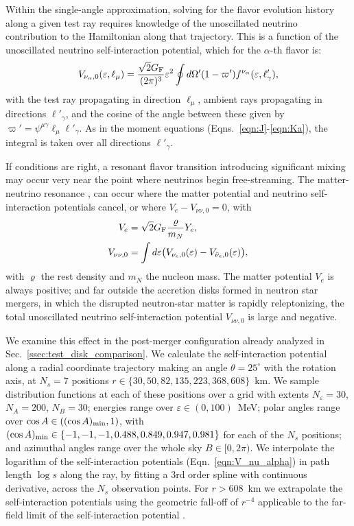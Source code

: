 \documentclass[aps,floatfix,prd,superscriptaddress,twocolumn]{revtex4-1}
\begin{document}
Within the single-angle approximation,
solving for the flavor evolution history along a given test ray
requires knowledge of the unoscillated neutrino contribution to the Hamiltonian
along that trajectory.
This is a function of the unoscillated neutrino self-interaction potential,
which for the $\alpha$-th flavor is:
\begin{equation}
  \label{eqn:V_nu_alpha}
  V_{\nu_\alpha,0}(\varepsilon,\ell_\mu) =
  \frac{\sqrt{2}G_{\rm F}}{(2\pi)^3} \varepsilon^2
  \oint d\Omega'(1-\varpi')f^{\nu_\alpha}(\varepsilon,\ell'_\gamma),
\end{equation}
with the test ray propagating in direction $\ell_\mu$,
ambient rays propagating in directions $\ell'_\gamma$,
and the cosine of the angle between these given by
$\varpi'=\psi^{\mu\gamma} \ell_\mu \ell'_\gamma$.
As in the moment equations (Eqns.~\ref{eqn:J}-\ref{eqn:Ka}),
the integral is taken over all directions $\ell'_\gamma$.

If conditions are right, a resonant flavor transition
introducing significant mixing may occur very near
the point where neutrinos begin free-streaming.
The matter-neutrino resonance
\cite{malk2012-mnr_1,malk2015-mnr_2,malk2016-mnr_3},
can occur where the matter potential and
neutrino self-interaction potentials cancel,
or where $V_e - V_{\nu\nu,0}=0$, with
\begin{align}
  \label{eqn:V_e}
  V_e &= \sqrt{2} G_{\rm F} \frac{\varrho}{m_N} Y_e, \\
  \label{eqn:V_nunu0}
  V_{\nu\nu,0} &= \int d\varepsilon
  \big(V_{\nu_e,0}(\varepsilon)-V_{\bar{\nu}_e,0}(\varepsilon)\big),
\end{align}
with $\varrho$ the rest density and $m_{N}$ the nucleon mass.
The matter potential $V_e$ is always positive;
and far outside the accretion disks formed in neutron star mergers,
in which the disrupted neutron-star matter is rapidly releptonizing,
the total unoscillated neutrino self-interaction potential $V_{\nu\nu,0}$
is large and negative.

We examine this effect in the post-merger configuration already analyzed
in Sec.~\ref{ssec:test_disk_comparison}.
We calculate the self-interaction potential along a radial coordinate trajectory
making an angle $\theta=25^\circ$ with the rotation axis,
at $N_s=7$ positions $r\in\{30,50,82,135,223,368,608\}$~km.
We sample distribution functions at each of these positions over a grid
with extents $N_\varepsilon=30$, $N_A=200$, $N_B=30$;
energies range over $\varepsilon\in(0,100)$~MeV;
polar angles range over $\cos A \in ((\cos A)_{\rm min}, 1)$, with
$(\cos A)_{\rm min}\in\{-1,-1,-1,0.488,0.849,0.947,0.981\}$
for each of the $N_s$ positions;
and azimuthal angles range over the whole sky $B\in[0,2\pi)$.
We interpolate the logarithm of the self-interaction potentials
(Eqn.~\ref{eqn:V_nu_alpha})
in path length $\log s$ along the ray,
by fitting a 3rd order spline with continuous derivative,
across the $N_s$ observation points.
For $r>608$~km we extrapolate the self-interaction potentials using the
geometric fall-off of $r^{-4}$ applicable to the far-field limit of the
self-interaction potential \cite{malk2016-mnr_3}.
\end{document}
